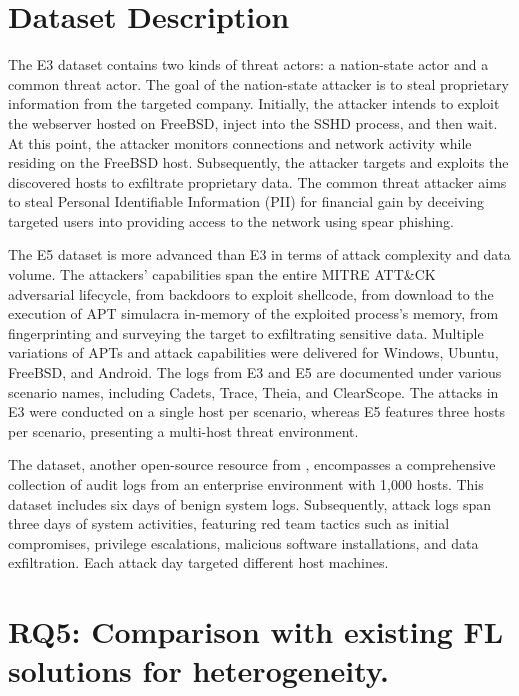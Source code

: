 \appendices

\section{Dataset Description}
\label{sec:dataset:description}

 The E3 dataset contains two kinds of threat actors: a nation-state actor and a common threat actor. The goal of the nation-state attacker is to steal proprietary information from the targeted company. Initially, the attacker intends to exploit the webserver hosted on FreeBSD, inject into the SSHD process, and then wait. At this point, the attacker monitors connections and network activity while residing on the FreeBSD host. Subsequently, the attacker targets and exploits the discovered hosts to exfiltrate proprietary data. The common threat attacker aims to steal Personal Identifiable Information (PII) for financial gain by deceiving targeted users into providing access to the network using spear phishing.

 The \darpa E5 dataset is more advanced than E3 in terms of attack complexity and data volume. The attackers' capabilities span the entire MITRE ATT\&CK~\cite{xiong2022cyber} adversarial lifecycle, from backdoors to exploit shellcode, from download to the execution of APT simulacra in-memory of the exploited process’s memory, from fingerprinting and surveying the target to exfiltrating sensitive data. Multiple variations of APTs and attack capabilities were delivered for Windows, Ubuntu, FreeBSD, and Android. The logs from E3 and E5 are documented under various scenario names, including Cadets, Trace, Theia, and ClearScope. The attacks in E3 were conducted on a single host per scenario, whereas E5 features three hosts per scenario, presenting a multi-host threat environment.

 The \optc dataset, another open-source resource from \darpa, encompasses a comprehensive collection of audit logs from an enterprise environment with 1,000 hosts. This dataset includes six days of benign system logs. Subsequently, attack logs span three days of system activities, featuring red team tactics such as initial compromises, privilege escalations, malicious software installations, and data exfiltration. Each attack day targeted different host machines.

 \section{RQ5: Comparison with existing FL solutions for heterogeneity.}
\label{sec:fedalternatives}


